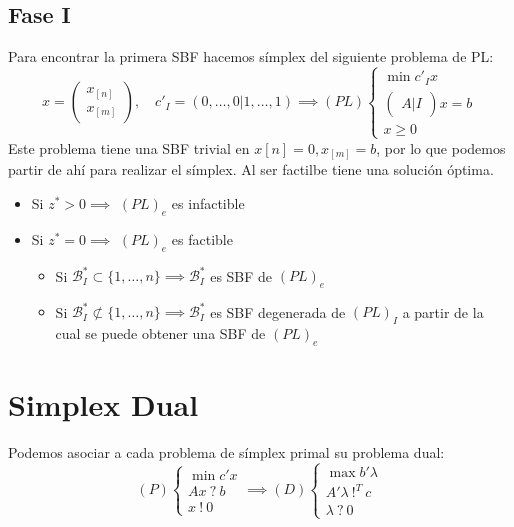 \documentclass[leqno]{article}
\begin{document}
\subsection{Fase I}
Para encontrar la primera SBF hacemos símplex del siguiente problema de PL:
$$
x = \begin{pmatrix} x_{[n]} \\ x_{[m]} \end{pmatrix}, \quad
c'_I = (0,\ldots,0|1, \ldots, 1)
\implies 
(PL)
\begin{cases}
    \min c'_Ix \\
    \begin{pmatrix} A  |  I \end{pmatrix} x = b \\
    x\geq 0
\end{cases}
$$
Este problema tiene una SBF trivial en $x{[n]} = 0, x_{[m]} = b$, por lo que podemos partir de ahí para realizar el símplex. Al ser factilbe tiene una solución óptima.
\begin{itemize}
    \item Si $z^*>0 \implies$ $(PL)_e$ es infactible
    \item Si $z^*=0 \implies$ $(PL)_e$ es factible
    \begin{itemize}
        \item Si $\mathcal{B}^*_I \subset \{1, \ldots , n\} \implies \mathcal{B}^*_I$ es SBF de $(PL)_e$
        \item Si $\mathcal{B}^*_I \not\subset \{1, \ldots , n\} \implies \mathcal{B}^*_I$ es SBF degenerada de $(PL)_I$ a partir de la cual se puede obtener una SBF de $(PL)_e$
    \end{itemize}
\end{itemize}


\section{Simplex Dual}
Podemos asociar a cada problema de símplex primal su problema dual:
$$
(P)
\begin{cases}
    \min c'x \\
    Ax \ ?\ b \\
    x \ ! \ 0
\end{cases}
\implies
(D)
\begin{cases}
    \max b'\lambda \\
    A'\lambda \ !^T\ c \\
    \lambda \ ? \ 0
\end{cases}
$$
\end{document}
